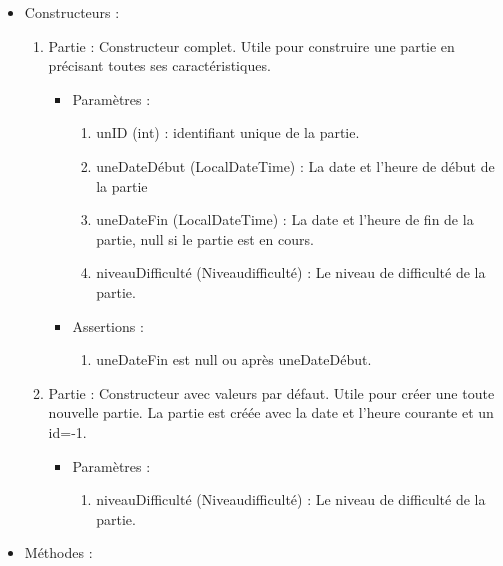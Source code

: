 \begin{itemize}
\begin{enumerate}
  \end{enumerate}

\item Constructeurs : 

  \begin{enumerate}
  \item Partie : Constructeur complet. Utile pour construire une partie en précisant toutes ses caractéristiques.
    \begin{itemize}
    \item Paramètres : 
      \begin{enumerate}
      \item unID (int) : identifiant unique de la partie.
      \item uneDateDébut (LocalDateTime) : La date et l'heure de début de la partie
      \item uneDateFin (LocalDateTime) : La date et l'heure de fin de la partie, null si le partie est en cours.
      \item niveauDifficulté (Niveaudifficulté) : Le niveau de difficulté de la partie.
      \end{enumerate}
    \item Assertions : 
      \begin{enumerate}
      \item uneDateFin est null ou après uneDateDébut.
      \end{enumerate}
    \end{itemize}
  \item Partie : Constructeur avec valeurs par défaut. Utile pour créer une toute nouvelle partie. La partie est créée avec la date et l'heure courante et un id=-1.
    \begin{itemize}
    \item Paramètres : 
      \begin{enumerate}
      \item niveauDifficulté (Niveaudifficulté) : Le niveau de difficulté de la partie.
      \end{enumerate}
    \end{itemize}

  \end{enumerate}

\item Méthodes : 


\end{itemize}
